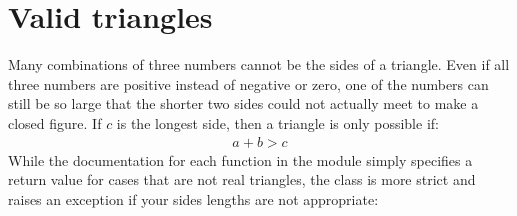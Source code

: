 \documentclass[letterpaper,10pt,english]{sphinxmanual}
\begin{document}
\begin{sphinxVerbatim}[commandchars=\\\{\}]
   
    
    
    
  
  
\end{sphinxVerbatim}


\section{Valid triangles}
\label{\detokenize{guide:valid-triangles}}
Many combinations of three numbers cannot be the sides of a triangle.
Even if all three numbers are positive instead of negative or zero,
one of the numbers can still be so large
that the shorter two sides
could not actually meet to make a closed figure.
If \(c\) is the longest side, then a triangle is only possible if:
\begin{equation*}
\begin{split}a + b > c\end{split}
\end{equation*}
While the documentation
for each function in the {\hyperref[\detokenize{api:module-trianglelib.utils}]{}} module
simply specifies a return value for cases that are not real triangles,
the {\hyperref[\detokenize{api:trianglelib.shape.Triangle}]{}} class is more strict
and raises an exception if your sides lengths are not appropriate:
\end{document}

